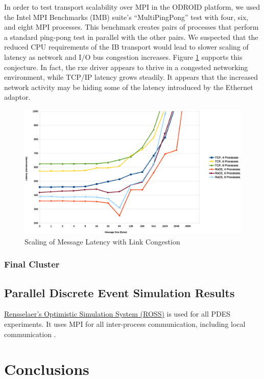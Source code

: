 \documentclass[a4paper]{article}
\begin{document}
In order to test transport scalability over MPI in the ODROID platform, we used
the Intel MPI Benchmarks (IMB) suite's ``MultiPingPong'' test with four, six,
and eight MPI processes. This benchmark creates pairs of processes that perform
a standard ping-pong test in parallel with the other pairs. We suspected that
the reduced CPU requirements of the IB transport would lead to slower scaling of
latency as network and I/O bus congestion increases. Figure \ref{multipingpong}
supports this conjecture. In fact, the rxe driver appears to thrive in a
congested networking environment, while TCP/IP latency grows steadily. It
appears that the increased network activity may be hiding some of the latency
introduced by the Ethernet adaptor. %

\begin{figure}[H]
\includegraphics[width=\textwidth]{pingpong_multi_zoom}
\caption{Scaling of Message Latency with Link Congestion}
\label{multipingpong}
\end{figure}

\subsubsection{\textbf{Final Cluster}}

\subsection{\textbf{Parallel Discrete Event Simulation Results}}

\href{https://github.com/carothersc/ROSS}{Rensselaer's Optimistic Simulation
  System (ROSS)} is used for all PDES experiments. It uses MPI for all
inter-process communication, including local communication \cite{carothers-02}.

\newpage
\section{\textbf{Conclusions}}
\label{conclusions}



\end{document}
